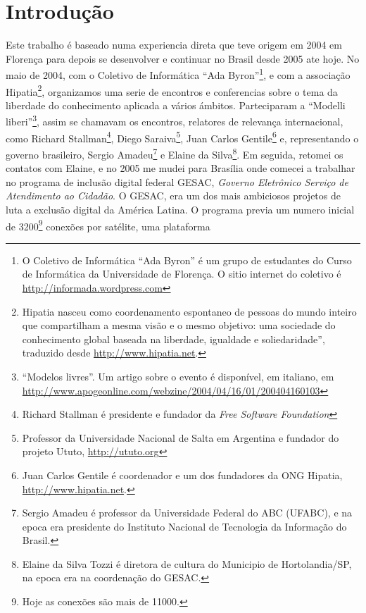 
\chapter{Introdução}
\label{Capitulo1}


Este trabalho é baseado numa experiencia direta que teve origem em
2004 em Florença para depois se desenvolver e continuar no Brasil
desde 2005 ate hoje. No maio de 2004, com o Coletivo de Informática
``Ada Byron''\footnote{O Coletivo de Informática ``Ada Byron'' é um
  grupo de estudantes do Curso de Informática da Universidade de
  Florença. O sitio internet do coletivo é
  \url{http://informada.wordpress.com}}, e com a associação
Hipatia\footnote{Hipatia nasceu como coordenamento espontaneo de
  pessoas do mundo inteiro que compartilham a mesma visão e o mesmo
  objetivo: uma sociedade do conhecimento global baseada na liberdade,
  igualdade e soliedaridade'', traduzido desde
  \url{http://www.hipatia.net}.}, organizamos uma serie de encontros e
conferencias sobre o tema da liberdade do conhecimento aplicada a
vários ámbitos. Parteciparam a ``Modelli liberi''\footnote{``Modelos
  livres''. Um artigo sobre o evento é disponível, em italiano, em
  \url{http://www.apogeonline.com/webzine/2004/04/16/01/200404160103}},
assim se chamavam os encontros, relatores de relevança internacional,
como Richard Stallman\footnote{Richard Stallman é presidente e
  fundador da \emph{Free Software Foundation}}, Diego
Saraiva\footnote{Professor da Universidade Nacional de Salta em
  Argentina e fundador do projeto Ututo, \url{http://ututo.org}}, Juan
Carlos Gentile\footnote{Juan Carlos Gentile é coordenador e um dos
  fundadores da ONG Hipatia, \url{http://www.hipatia.net}.} e,
representando o governo brasileiro, Sergio Amadeu\footnote{Sergio
  Amadeu é professor da Universidade Federal do ABC (UFABC), e na
  epoca era presidente do Instituto Nacional de Tecnologia da
  Informação do Brasil.} e Elaine da Silva\footnote{Elaine da Silva
  Tozzi é diretora de cultura do Municipio de Hortolandia/SP, na epoca
  era na coordenação do GESAC.}. Em seguida, retomei os contatos com
Elaine, e no 2005 me mudei para Brasília onde comecei a trabalhar no
programa de inclusão digital federal GESAC, \emph{Governo Eletrônico
  Serviço de Atendimento ao Cidadão}. O GESAC, era um dos mais
ambiciosos projetos de luta a exclusão digital da América Latina. O
programa previa um numero inicial de 3200\footnote{Hoje as
  conexões são mais de 11000.} conexões por satélite, uma plataforma
